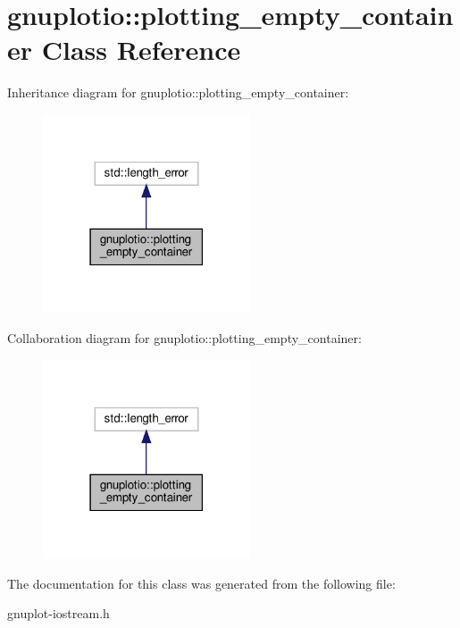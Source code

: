 \hypertarget{classgnuplotio_1_1plotting__empty__container}{}\section{gnuplotio\+:\+:plotting\+\_\+empty\+\_\+container Class Reference}
\label{classgnuplotio_1_1plotting__empty__container}


Inheritance diagram for gnuplotio\+:\+:plotting\+\_\+empty\+\_\+container\+:
\nopagebreak
\begin{figure}[H]
\begin{center}
\leavevmode
\includegraphics[width=174pt]{classgnuplotio_1_1plotting__empty__container__inherit__graph}
\end{center}
\end{figure}


Collaboration diagram for gnuplotio\+:\+:plotting\+\_\+empty\+\_\+container\+:
\nopagebreak
\begin{figure}[H]
\begin{center}
\leavevmode
\includegraphics[width=174pt]{classgnuplotio_1_1plotting__empty__container__coll__graph}
\end{center}
\end{figure}


The documentation for this class was generated from the following file\+:\begin{DoxyCompactItemize}
\item 
gnuplot-\/iostream.\+h\end{DoxyCompactItemize}
